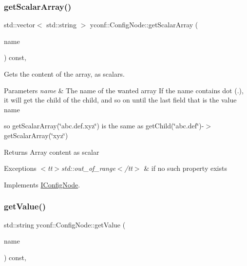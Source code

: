 \subsubsection{\texorpdfstring{get\+Scalar\+Array()}{getScalarArray()}}
{\footnotesize\ttfamily std\+::vector$<$ std\+::string $>$ yconf\+::\+Config\+Node\+::get\+Scalar\+Array (\begin{DoxyParamCaption}\item[{const std\+::string \&}]{name }\end{DoxyParamCaption}) const\hspace{0.3cm}{\ttfamily [override]}, {\ttfamily [virtual]}}



Gets the content of the array, as scalars. 


\begin{DoxyParams}{Parameters}
{\em name} & The name of the wanted array If the name contains dot ({\ttfamily .}), it will get the child of the child, and so on until the last field that is the value name\\
\hline
\end{DoxyParams}
so {\ttfamily get\+Scalar\+Array(\char`\"{}abc.\+def.\+xyz\char`\"{})} is the same as {\ttfamily get\+Child(\char`\"{}abc.\+def\char`\"{})-\/$>$get\+Scalar\+Array(\char`\"{}xyz\char`\"{})}

\begin{DoxyReturn}{Returns}
Array content as scalar 
\end{DoxyReturn}

\begin{DoxyExceptions}{Exceptions}
{\em $<$tt$>$std\+::out\+\_\+of\+\_\+range$<$/tt$>$} & if no such property exists \\
\hline
\end{DoxyExceptions}


Implements \hyperlink{classIConfigNode_aaa66c9d23d521b5b5c9f5f6bf35087fb}{I\+Config\+Node}.

\mbox{\label{classyconf_1_1ConfigNode_a4670a614581800cfaef06670ad2a0276}} 
\subsubsection{\texorpdfstring{get\+Value()}{getValue()}}
{\footnotesize\ttfamily std\+::string yconf\+::\+Config\+Node\+::get\+Value (\begin{DoxyParamCaption}\item[{const std\+::string \&}]{name }\end{DoxyParamCaption}) const\hspace{0.3cm}{\ttfamily [override]}, {\ttfamily [virtual]}}




